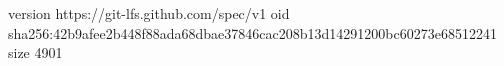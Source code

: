 version https://git-lfs.github.com/spec/v1
oid sha256:42b9afee2b448f88ada68dbae37846cac208b13d14291200bc60273e68512241
size 4901
